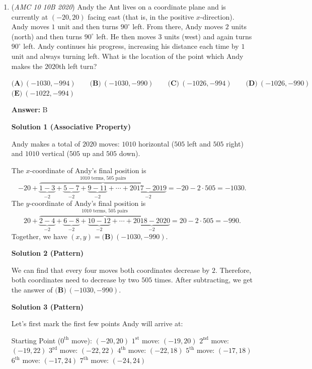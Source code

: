 \begin{enumerate}
 by DearPrince

 


 


 


	\item (\textit{AMC 10 10B 2020}) Andy the Ant lives on a coordinate plane and is currently at $(-20, 20)$ facing east (that is, in the positive $x$-direction). Andy moves $1$ unit and then turns $90^{\circ}$ left. From there, Andy moves $2$ units (north) and then turns $90^{\circ}$ left. He then moves $3$ units (west) and again turns $90^{\circ}$ left. Andy continues his progress, increasing his distance each time by $1$ unit and always turning left. What is the location of the point which Andy makes the $2020$th left turn?


 $\textbf{(A)}\ (-1030, -994)\qquad\textbf{(B)}\ (-1030, -990)\qquad\textbf{(C)}\ (-1026, -994)\qquad\textbf{(D)}\ (-1026, -990)$
$\textbf{(E)}\ (-1022, -994)$

 \textbf{Answer: }B



\textbf{Solution 1 (Associative Property)}

Andy makes a total of $2020$ moves: $1010$ horizontal ($505$ left and $505$ right) and $1010$ vertical ($505$ up and $505$ down).

 The $x$-coordinate of Andy's final position is 
 \[-20+\overbrace{\underbrace{1-3}_{-2}+\underbrace{5-7}_{-2}+\underbrace{9-11}_{-2}+\cdots+\underbrace{2017-2019}_{-2}}^{\text{1010 terms, 505 pairs}}=-20-2\cdot505=-1030.\]The $y$-coordinate of Andy's final position is 
 \[20+\overbrace{\underbrace{2-4}_{-2}+\underbrace{6-8}_{-2}+\underbrace{10-12}_{-2}+\cdots+\underbrace{2018-2020}_{-2}}^{\text{1010 terms, 505 pairs}}=20-2\cdot505=-990.\]Together, we have $(x,y)=\boxed{\textbf{(B)}\ (-1030, -990)}.$




\textbf{Solution 2 (Pattern)}

We can find that every four moves both coordinates decrease by $2.$ Therefore, both coordinates need to decrease by two $505$ times. After subtracting, we get the answer of $\boxed{\textbf{(B)}\ (-1030, -990)}.$




\textbf{Solution 3 (Pattern)}

Let's first mark the first few points Andy will arrive at:

 Starting Point ($0^{\text{th}}$ move): $(-20,20)$
$1^{\text{st}}$ move: $(-19,20)$
$2^{\text{nd}}$ move: $(-19,22)$
$3^{\text{rd}}$ move: $(-22,22)$
$4^{\text{th}}$ move: $(-22,18)$
$5^{\text{th}}$ move: $(-17,18)$
$6^{\text{th}}$ move: $(-17,24)$
$7^{\text{th}}$ move: $(-24, 24)$


\end{enumerate}
